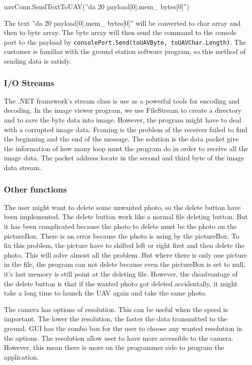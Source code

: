 \documentclass[oneside]{ecsgdp}         %
\begin{document}
\begin{center}
uavConn.SendTextToUAV(''da 20 payload[0].mem\_ bytes[0]'')\;
\end{center}

The text ''da 20 payload[0].mem\_ bytes[0]'' will be converted to char array and then to byte array. The byte array will then send the command to the console port to the payload by \texttt{consolePort.Send(toUAVByte, toUAVChar.Length)}. The customer is familiar with the ground station software program, so this method of sending data is satisfy. 

\subsubsection*{I/O Streams}
    The .NET framework's stream class is use as a powerful tools for encoding and decoding\cite{davidB}. In the image viewer program, we use FileStream to create a directory and to save the byte data into image. However, the program might have to deal with a corrupted image data. Framing is the problem of the receiver failed to find the beginning and the end of the message. The solution is the data packet give the information of how many loop must the program do in order to receive all the image data. The packet address locate in the second and third byte of the image data stream. 
    
    
    
\subsubsection*{Other functions}
The user might want to delete some unwanted photo, so the delete button have been implemented. The delete button work like a normal file deleting button. But it has been complicated because the photo to delete must be the photo on the pictureBox. There is an error because the photo is using by the pictureBox. To fix this problem, the picture have to shifted left or right first and then delete the photo. This will solve almost all the problem. But where there is only one picture in the file, the program can not delete because even the pictureBox is set to null, it's last memory is still point at the deleting file. However, the disadvantage of the delete button is that if the wanted photo got deleted accidentally, it might take a long time to launch the UAV again and take the same photo.

The camera has options of resolution. This can be useful when the speed is important. The lower the resolution, the faster the data transmitted to the ground. GUI has the combo box for the user to choose any wanted resolution in the options. The resolution allow user to have more accessible to the camera. However, this mean there is more on the programmer side to program the application.
\end{document}
